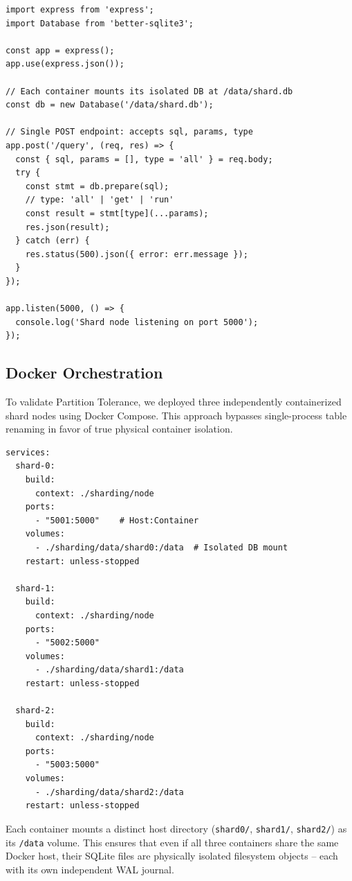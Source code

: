 \documentclass[sigconf]{acmart}
\begin{document}
\begin{lstlisting}[style=jsstyle, caption={Shard Node Express Server (sharding/node/server.js)}]
import express from 'express';
import Database from 'better-sqlite3';

const app = express();
app.use(express.json());

// Each container mounts its isolated DB at /data/shard.db
const db = new Database('/data/shard.db');

// Single POST endpoint: accepts sql, params, type
app.post('/query', (req, res) => {
  const { sql, params = [], type = 'all' } = req.body;
  try {
    const stmt = db.prepare(sql);
    // type: 'all' | 'get' | 'run'
    const result = stmt[type](...params);
    res.json(result);
  } catch (err) {
    res.status(500).json({ error: err.message });
  }
});

app.listen(5000, () => {
  console.log('Shard node listening on port 5000');
});
\end{lstlisting}

\subsection{Docker Orchestration}

To validate Partition Tolerance, we deployed three independently containerized shard nodes using Docker Compose. This approach bypasses single-process table renaming in favor of true physical container isolation.

\begin{lstlisting}[style=logstyle, caption={Docker Orchestration Infrastructure (docker-compose.yml)}]
services:
  shard-0:
    build:
      context: ./sharding/node
    ports:
      - "5001:5000"    # Host:Container
    volumes:
      - ./sharding/data/shard0:/data  # Isolated DB mount
    restart: unless-stopped

  shard-1:
    build:
      context: ./sharding/node
    ports:
      - "5002:5000"
    volumes:
      - ./sharding/data/shard1:/data
    restart: unless-stopped

  shard-2:
    build:
      context: ./sharding/node
    ports:
      - "5003:5000"
    volumes:
      - ./sharding/data/shard2:/data
    restart: unless-stopped
\end{lstlisting}

Each container mounts a distinct host directory (\texttt{shard0/}, \texttt{shard1/}, \texttt{shard2/}) as its \texttt{/data} volume. This ensures that even if all three containers share the same Docker host, their SQLite files are physically isolated filesystem objects -- each with its own independent WAL journal.
\end{document}

